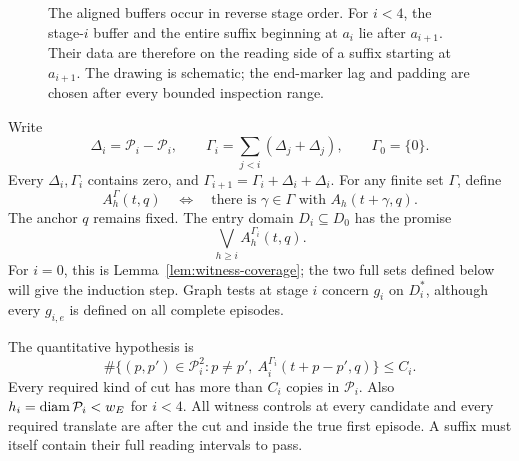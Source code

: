 \begin{figure}[htbp]
\centering
{}
\caption{The aligned buffers occur in reverse stage order. For $i<4$, the
stage-$i$ buffer and the entire suffix beginning at $a_i$ lie after
$a_{i+1}$. Their data are therefore on the reading side of a suffix
starting at $a_{i+1}$. The drawing is schematic; the end-marker lag
and padding are chosen after every bounded inspection range.}\label{fig:reverse-buffers}
\end{figure}

Write
\begin{equation}\label{eq:gamma}
 \Delta_i=\mathcal P_i-\mathcal P_i,\qquad
 \Gamma_i=\sum_{j<i}(\Delta_j+\Delta_j),\qquad
 \Gamma_0=\{0\}.
\end{equation}
Every $\Delta_i,\Gamma_i$ contains zero, and
$\Gamma_{i+1}=\Gamma_i+\Delta_i+\Delta_i$.
For any finite set $\Gamma$, define
\[
 A_h^\Gamma(t,q)
 \quad\Longleftrightarrow\quad
 \text{there is }\gamma\in\Gamma\text{ with }A_h(t+\gamma,q).
\]
The anchor $q$ remains fixed. The entry domain $D_i\subseteq D_0$ has
the promise
\begin{equation}\label{eq:entry-promise}
                 \bigvee_{h\ge i}A_h^{\Gamma_i}(t,q).
\end{equation}
For $i=0$, this is Lemma~\ref{lem:witness-coverage}; the two full sets
defined below will give the induction step. Graph tests at stage $i$
concern $g_i$ on $D_i^*$, although every $g_{i,e}$ is defined on all
complete episodes.

The quantitative hypothesis is
\begin{equation}\label{eq:ambiguity-bound}
 \#\{(p,p')\in\mathcal P_i^2:p\ne p',\
                A_i^{\Gamma_i}(t+p-p',q)\}\le C_i.
\end{equation}
Every required kind of cut has more than $C_i$ copies in $\mathcal P_i$.
Also $h_i=\operatorname{diam}\mathcal P_i<w_E$ for $i<4$.
All witness controls at every candidate and every required translate
are after the cut and inside the true first episode. A suffix must
itself contain their full reading intervals to pass.

